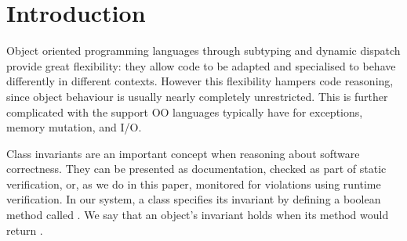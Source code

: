 \section{Introduction}
\label{s:intro}

Object oriented programming languages through subtyping and dynamic dispatch provide great flexibility: they
allow code to be adapted and specialised to behave differently in different contexts.
However this flexibility hampers code reasoning, since object behaviour is usually nearly completely
unrestricted. This is further complicated with the support OO languages typically have for exceptions,
memory mutation, and I/O.


Class invariants are an important concept when reasoning about software correctness.
They can be presented as documentation, checked as part of static verification, or, as we do in this paper, monitored for violations using runtime verification.
In our system, a class specifies its invariant by defining a boolean method called \Q@invariant@.
We say that an object's invariant holds when its \Q@invariant@ method would return \Q@true@.

